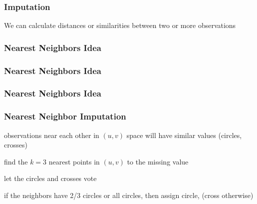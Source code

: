 \documentclass[12pt]{beamer}\usepackage[]{graphicx}\usepackage[]{color}
\begin{document}

\begin{frame}
\begin{center}
\Huge{}
\end{center}
\end{frame}


\begin{frame}
\frametitle{Imputation}

We can calculate distances or similarities between two or more observations
\eb

\end{frame}


\begin{frame}
\frametitle{Nearest Neighbors Idea}
\begin{center}
\end{center}
\end{frame}


\begin{frame}
\frametitle{Nearest Neighbors Idea}
\begin{center}
\end{center}
\end{frame}


\begin{frame}
\frametitle{Nearest Neighbors Idea}
\begin{center}
\end{center}
\end{frame}


\begin{frame}[fragile]
\frametitle{Nearest Neighbor Imputation}

\bbi
  \item observations near each other in $(u, v)$ space will have similar values (circles, crosses)
  \item find the $k=3$ nearest points in $(u, v)$ to the missing value
  \item let the circles and crosses vote
  \item if the neighbors have 2/3 circles or all circles, then assign circle, (cross otherwise)
\ei

\end{frame}
\end{document}
